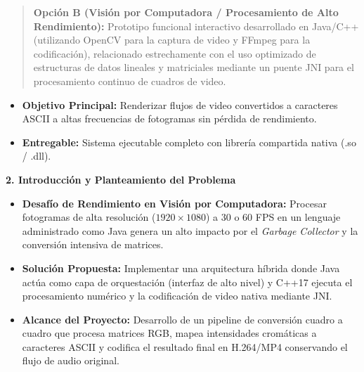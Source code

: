 \documentclass[12pt]{article}
\begin{document}
\vspace{1cm}
\begin{quote}
\textbf{Opción B (Visión por Computadora / Procesamiento de Alto Rendimiento):} Prototipo funcional interactivo desarrollado en Java/C++ (utilizando OpenCV para la captura de video y FFmpeg para la codificación), relacionado estrechamente con el uso optimizado de estructuras de datos lineales y matriciales mediante un puente JNI para el procesamiento continuo de cuadros de video.
\end{quote}

\vspace{1cm}
\begin{itemize}
    \item \textbf{Objetivo Principal:} Renderizar flujos de video convertidos a caracteres ASCII a altas frecuencias de fotogramas sin pérdida de rendimiento.
    \item \textbf{Entregable:} Sistema ejecutable completo con librería compartida nativa (.so / .dll).
\end{itemize}

\newpage

{\Huge \bfseries 2. Introducción y Planteamiento del Problema}\\[1cm]

\Large
\begin{itemize}
    \item \textbf{Desafío de Rendimiento en Visión por Computadora:}
    Procesar fotogramas de alta resolución ($1920 \times 1080$) a 30 o 60 FPS en un lenguaje administrado como Java genera un alto impacto por el \textit{Garbage Collector} y la conversión intensiva de matrices.
    
    \item \textbf{Solución Propuesta:}
    Implementar una arquitectura híbrida donde Java actúa como capa de orquestación (interfaz de alto nivel) y C++17 ejecuta el procesamiento numérico y la codificación de video nativa mediante JNI.
    
    \item \textbf{Alcance del Proyecto:}
    Desarrollo de un pipeline de conversión cuadro a cuadro que procesa matrices RGB, mapea intensidades cromáticas a caracteres ASCII y codifica el resultado final en H.264/MP4 conservando el flujo de audio original.
\end{itemize}
\end{document}
